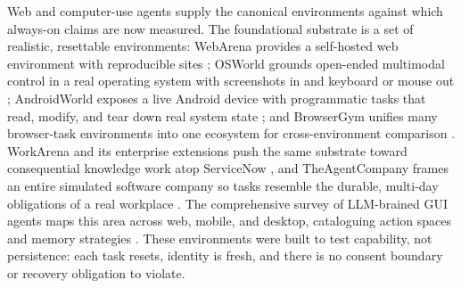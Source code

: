 Web and computer-use agents supply the canonical environments against which always-on claims are now measured. The foundational substrate is a set of realistic, resettable environments: WebArena provides a self-hosted web environment with reproducible sites \citep{zhou2024webarenarealisticwebenvironment}; OSWorld grounds open-ended multimodal control in a real operating system with screenshots in and keyboard or mouse out \citep{xie2024osworldbenchmarkingmultimodalagents}; AndroidWorld exposes a live Android device with programmatic tasks that read, modify, and tear down real system state \citep{rawles2024androidworld}; and BrowserGym unifies many browser-task environments into one ecosystem for cross-environment comparison \citep{lesellierdechezelles2025browsergym}. WorkArena and its enterprise extensions push the same substrate toward consequential knowledge work atop ServiceNow \citep{drouin2024workarena, boisvert2024workarena}, and TheAgentCompany frames an entire simulated software company so tasks resemble the durable, multi-day obligations of a real workplace \citep{xu2025theagentcompany}. The comprehensive survey of LLM-brained GUI agents maps this area across web, mobile, and desktop, cataloguing action spaces and memory strategies \citep{zhang2024llmguisurvey}. These environments were built to test capability, not persistence: each task resets, identity is fresh, and there is no consent boundary or recovery obligation to violate.


